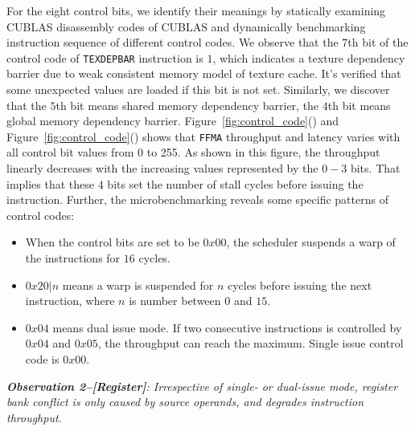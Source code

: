 For the eight control bits, we identify their meanings by statically examining CUBLAS disassembly codes of CUBLAS and 
dynamically benchmarking instruction sequence of different control codes. We observe that the $7$th bit of the control 
code of {\tt TEXDEPBAR} instruction is $1$, which
indicates a texture dependency barrier due to weak consistent memory model of texture cache. It's verified that some 
unexpected values are
loaded if this bit is not set. Similarly, we discover that the $5$th bit means shared memory dependency barrier, the
$4$th bit means global memory dependency barrier. Figure~\ref{fig:control_code}() and 
Figure~\ref{fig:control_code}() shows that {\tt FFMA} throughput and latency varies with 
all control bit values from 0 to 255. As shown in this figure, the throughput linearly decreases with the increasing 
values represented by the $0-3$ bits. That implies that these $4$ bits set the number of stall cycles before issuing 
the instruction. Further, the microbenchmarking reveals some specific patterns of control codes:

\begin{itemize}
\item When the control bits are set to be $0x00$, the scheduler suspends a warp of the instructions for $16$ cycles.
\item $0x20|n$ means a warp is suspended for $n$ cycles before issuing the next instruction, where $n$ is number 
between $0$ and $15$.
\item $0x04$ means dual issue mode. If two consecutive instructions is controlled by $0x04$ and $0x05$, the throughput 
can reach the maximum. Single issue control code is $0x00$.
\end{itemize}


{\em {\bf Observation 2--[Register]}: Irrespective of single- or dual-issue mode, register bank conflict is only caused 
by source operands, and degrades instruction throughput.}


